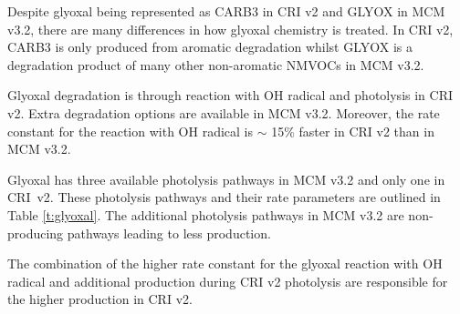 Despite glyoxal being represented as CARB3 in CRI v2 and GLYOX in MCM v3.2, there are many differences in how glyoxal chemistry is treated. 
In CRI v2, CARB3 is only produced from aromatic degradation whilst GLYOX is a degradation product of many other non-aromatic NMVOCs in MCM v3.2. 

Glyoxal degradation is through reaction with OH radical and photolysis in CRI v2. 
Extra degradation options are available in MCM v3.2. 
Moreover, the rate constant for the reaction with OH radical is $\sim$ 15\% faster in CRI v2 than in MCM v3.2. 

Glyoxal has three available photolysis pathways in MCM v3.2 and only one in \mbox{CRI v2}. 
These photolysis pathways and their rate parameters are outlined in Table \ref{t:glyoxal}. 
The additional photolysis pathways in MCM v3.2 are non- producing pathways leading to less  production.

The combination of the higher rate constant for the glyoxal reaction with OH radical and additional  production during CRI v2 photolysis are responsible for the higher  production in CRI v2. 
